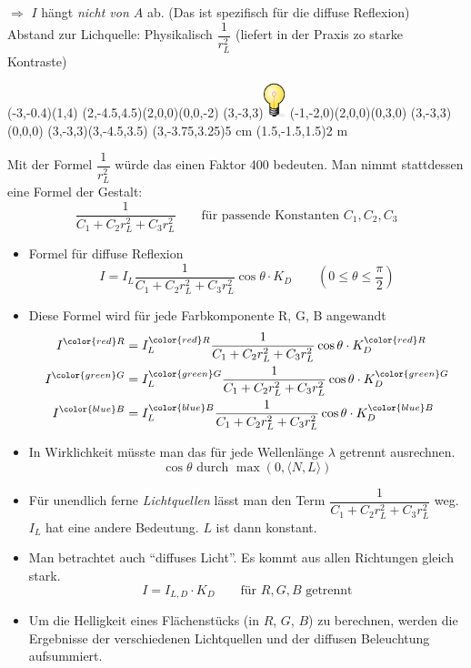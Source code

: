 	$\Rightarrow$ $I$ hängt \emph{nicht von $A$} ab. (Das ist spezifisch für die diffuse Reflexion)\\
	Abstand zur Lichquelle: Physikalisch $\dfrac{1}{r_L^2}$ (liefert in der Praxis zo starke
	Kontraste)
	\begin{center}
		\begin{pspicture}(-3,-0.4)(1,4)
			\pstThreeDSquare(2,-4.5,4.5)(2,0,0)(0,0,-2)
			\pstThreeDPut(3,-3,3){\includegraphics[height=1cm]{bulb.eps}}
			\pstThreeDSquare(-1,-2,0)(2,0,0)(0,3,0)
			\pstThreeDLine[linecolor=yellow]{->}(3,-3,3)(0,0,0)
			\pstThreeDLine[linecolor=yellow]{->}(3,-3,3)(3,-4.5,3.5)
			\pstThreeDPut(3,-3.75,3.25){5 cm}
			\pstThreeDPut(1.5,-1.5,1.5){2 m}
		\end{pspicture}
	\end{center}
	Mit der Formel $\dfrac{1}{r_L^2}$ würde das einen Faktor 400 bedeuten.
	Man nimmt stattdessen eine Formel der Gestalt:
	\[\frac{1}{C_1 + C_2 r_L^2 + C_3 r_L^2} \qquad \text{für passende Konstanten $C_1, C_2, C_3$}\]
	\begin{itemize}
	 \item Formel für diffuse Reflexion
		\[\boxed{I = I_L \frac{1}{C_1 + C_2 r_L^2 + C_3 r_L^2} \cos \theta \cdot K_D} \qquad \left(0 \le \theta \le \frac{\pi}{2}\right)\]
	 \item Diese Formel wird für jede Farbkomponente {\color{red}R}, {\color{green}G}, {\color{blue}B} angewandt
		\begin{align*}
		I^{\color{red}R} &= I^{\color{red}R}_L \frac{1}{C_1 + C_2 r_L^2 + C_3 r_L^2} \cos \theta \cdot K^{\color{red}R}_D\\
		I^{\color{green}G} &= I^{\color{green}G}_L \frac{1}{C_1 + C_2 r_L^2 + C_3 r_L^2} \cos \theta \cdot K^{\color{green}G}_D\\
		I^{\color{blue}B} &= I^{\color{blue}B}_L \frac{1}{C_1 + C_2 r_L^2 + C_3 r_L^2} \cos \theta \cdot K^{\color{blue}B}_D
		\end{align*}
	 \item In Wirklichkeit müsste man das für jede Wellenlänge $\lambda$ getrennt ausrechnen.
		\[\cos \theta \text{ durch } \max(0,\langle N, L \rangle)\]
	 \item Für unendlich ferne \emph{Lichtquellen} lässt man den Term $\dfrac{1}{C_1 + C_2 r_L^2 + C_3 r_L^2}$ weg.
		$I_L$ hat eine andere Bedeutung. $L$ ist dann konstant.

	 \item Man betrachtet auch "`diffuses Licht"'. Es kommt aus allen Richtungen gleich stark.
		\[ I = I_{L,D} \cdot K_D \qquad \text{für $R,G,B$ getrennt}\]
	 \item Um die Helligkeit eines Flächenstücks (in $R$, $G$, $B$) zu berechnen, werden die Ergebnisse der verschiedenen
		Lichtquellen und der diffusen Beleuchtung aufsummiert.
	\end{itemize}




